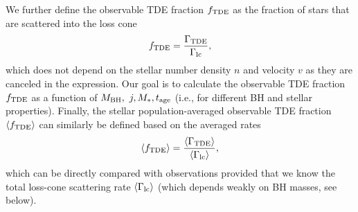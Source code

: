 \documentclass[useAMS,usenatbib]{mn2e}
\def\mBH{M_{\rm BH}}
\def\GammaTDE{\Gamma_{\rm TDE}}
\def\Gammacapt{\Gamma_{\rm capt}}
\def\Gammalc{\Gamma_{\rm lc}}
\def\fTDE{f_{\rm TDE}}
\def\tage{t_{\rm age}}
\def\note{\textcolor{magenta}}
\newcommand{\lara}[1]{\left\langle{#1}\right\rangle}
\begin{document}
We further define the observable TDE fraction $\fTDE$ as the fraction of stars that are scattered into the loss cone
\begin{equation}\label{eq:fTDE}
    \fTDE=\frac{\GammaTDE}{\Gammalc},
\end{equation}
which does not depend on the stellar number density $n$ and velocity $v$ as they are canceled in the expression. Our goal is to calculate the observable TDE fraction $\fTDE$ as a function of $\mBH, \ j, M_*, \tage$ (i.e., for different BH and stellar properties). Finally, the stellar population-averaged observable TDE fraction $\lara{\fTDE}$ can similarly be defined based on the averaged rates
\begin{equation}\label{eq:fTDE_avg}
    \lara{\fTDE}=\frac{\lara{\GammaTDE}}{\lara{\Gammalc}},
\end{equation}
which can be directly compared with observations provided that we know the total loss-cone scattering rate $\lara{\Gammalc}$ (which depends weakly on BH masses, see below).




\end{document}
